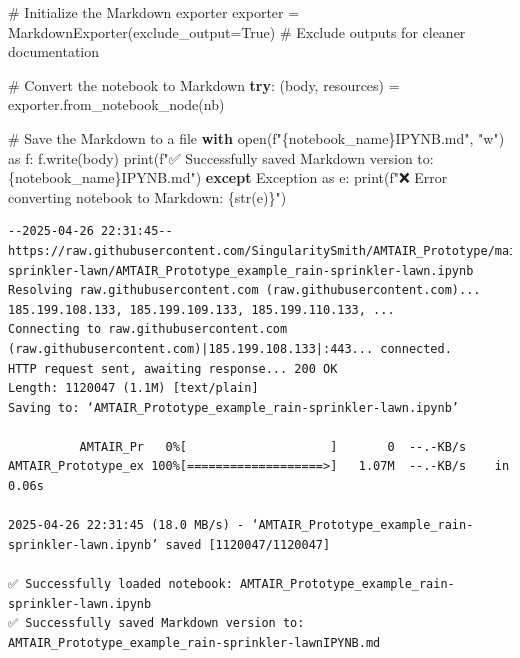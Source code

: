 \documentclass[
  11pt,
  letterpaper,
]{book}
\newenvironment{Shaded}{\begin{snugshade}}{\end{snugshade}}
\newcommand{\BuiltInTok}[1]{\textcolor[rgb]{0.00,0.23,0.31}{#1}}
\newcommand{\CommentTok}[1]{\textcolor[rgb]{0.37,0.37,0.37}{#1}}
\newcommand{\ControlFlowTok}[1]{\textcolor[rgb]{0.00,0.23,0.31}{\textbf{#1}}}
\newcommand{\ImportTok}[1]{\textcolor[rgb]{0.00,0.46,0.62}{#1}}
\newcommand{\NormalTok}[1]{\textcolor[rgb]{0.00,0.23,0.31}{#1}}
\newcommand{\OperatorTok}[1]{\textcolor[rgb]{0.37,0.37,0.37}{#1}}
\newcommand{\PreprocessorTok}[1]{\textcolor[rgb]{0.68,0.00,0.00}{#1}}
\newcommand{\SpecialCharTok}[1]{\textcolor[rgb]{0.37,0.37,0.37}{#1}}
\newcommand{\SpecialStringTok}[1]{\textcolor[rgb]{0.13,0.47,0.30}{#1}}
\newcommand{\StringTok}[1]{\textcolor[rgb]{0.13,0.47,0.30}{#1}}
\newcommand{\VariableTok}[1]{\textcolor[rgb]{0.07,0.07,0.07}{#1}}
\begin{document}
\begin{Shaded}
\begin{Highlighting}[]
\CommentTok{\# Initialize the Markdown exporter}
\NormalTok{exporter }\OperatorTok{=}\NormalTok{ MarkdownExporter(exclude\_output}\OperatorTok{=}\VariableTok{True}\NormalTok{)  }\CommentTok{\# Exclude outputs for cleaner documentation}

\CommentTok{\# Convert the notebook to Markdown}
\ControlFlowTok{try}\NormalTok{:}
\NormalTok{    (body, resources) }\OperatorTok{=}\NormalTok{ exporter.from\_notebook\_node(nb)}

    \CommentTok{\# Save the Markdown to a file}
    \ControlFlowTok{with} \BuiltInTok{open}\NormalTok{(}\SpecialStringTok{f"}\SpecialCharTok{\{}\NormalTok{notebook\_name}\SpecialCharTok{\}}\SpecialStringTok{IPYNB.md"}\NormalTok{, }\StringTok{"w"}\NormalTok{) }\ImportTok{as}\NormalTok{ f:}
\NormalTok{        f.write(body)}
    \BuiltInTok{print}\NormalTok{(}\SpecialStringTok{f"✅ Successfully saved Markdown version to: }\SpecialCharTok{\{}\NormalTok{notebook\_name}\SpecialCharTok{\}}\SpecialStringTok{IPYNB.md"}\NormalTok{)}
\ControlFlowTok{except} \PreprocessorTok{Exception} \ImportTok{as}\NormalTok{ e:}
    \BuiltInTok{print}\NormalTok{(}\SpecialStringTok{f"❌ Error converting notebook to Markdown: }\SpecialCharTok{\{}\BuiltInTok{str}\NormalTok{(e)}\SpecialCharTok{\}}\SpecialStringTok{"}\NormalTok{)}
\end{Highlighting}
\end{Shaded}

\begin{verbatim}
--2025-04-26 22:31:45--  https://raw.githubusercontent.com/SingularitySmith/AMTAIR_Prototype/main/data/example_rain-sprinkler-lawn/AMTAIR_Prototype_example_rain-sprinkler-lawn.ipynb
Resolving raw.githubusercontent.com (raw.githubusercontent.com)... 185.199.108.133, 185.199.109.133, 185.199.110.133, ...
Connecting to raw.githubusercontent.com (raw.githubusercontent.com)|185.199.108.133|:443... connected.
HTTP request sent, awaiting response... 200 OK
Length: 1120047 (1.1M) [text/plain]
Saving to: ‘AMTAIR_Prototype_example_rain-sprinkler-lawn.ipynb’

          AMTAIR_Pr   0%[                    ]       0  --.-KB/s               AMTAIR_Prototype_ex 100%[===================>]   1.07M  --.-KB/s    in 0.06s   

2025-04-26 22:31:45 (18.0 MB/s) - ‘AMTAIR_Prototype_example_rain-sprinkler-lawn.ipynb’ saved [1120047/1120047]

✅ Successfully loaded notebook: AMTAIR_Prototype_example_rain-sprinkler-lawn.ipynb
✅ Successfully saved Markdown version to: AMTAIR_Prototype_example_rain-sprinkler-lawnIPYNB.md
\end{verbatim}
\end{document}
